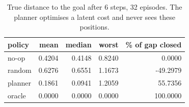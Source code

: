 \begin{table}[t]
\centering
\begin{tabular}{lrrrr}
\toprule
policy & mean & median & worst & \% of gap closed \\
\midrule
no-op & 0.4204 & 0.4148 & 0.8240 & 0.0000 \\
random & 0.6276 & 0.6551 & 1.1673 & -49.2979 \\
planner & 0.1861 & 0.0941 & 1.2059 & 55.7356 \\
oracle & 0.0000 & 0.0000 & 0.0000 & 100.0000 \\
\bottomrule
\end{tabular}
\caption{True distance to the goal after 6 steps, 32 episodes. The planner optimises a latent cost and never sees these positions.}
\label{tab:planning}
\end{table}

